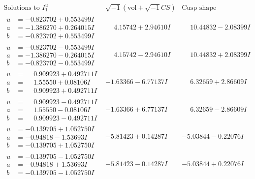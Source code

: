 \documentclass[1p]{elsarticle_modified}
\theoremstyle{definition}
\newcommand{\I}{\sqrt{-1}}
\begin{document}
$$\begin{array}{c|c|c}  
\text{Solutions to }I^u_{1}& \I (\text{vol} + \sqrt{-1}CS) & \text{Cusp shape}\\
 \hline 
\begin{aligned}
u &= -0.823702 + 0.553499 I \\
a &= -1.386270 + 0.264015 I \\
b &= -0.823702 + 0.553499 I\end{aligned}
 & \phantom{-}4.15742 + 2.94610 I & \phantom{-}10.44832 - 2.08399 I \\ \hline\begin{aligned}
u &= -0.823702 - 0.553499 I \\
a &= -1.386270 - 0.264015 I \\
b &= -0.823702 - 0.553499 I\end{aligned}
 & \phantom{-}4.15742 - 2.94610 I & \phantom{-}10.44832 + 2.08399 I \\ \hline\begin{aligned}
u &= \phantom{-}0.909923 + 0.492711 I \\
a &= \phantom{-}1.55550 + 0.08106 I \\
b &= \phantom{-}0.909923 + 0.492711 I\end{aligned}
 & -1.63366 - 6.77137 I & \phantom{-}6.32659 + 2.86609 I \\ \hline\begin{aligned}
u &= \phantom{-}0.909923 - 0.492711 I \\
a &= \phantom{-}1.55550 - 0.08106 I \\
b &= \phantom{-}0.909923 - 0.492711 I\end{aligned}
 & -1.63366 + 6.77137 I & \phantom{-}6.32659 - 2.86609 I \\ \hline\begin{aligned}
u &= -0.139705 + 1.052750 I \\
a &= -0.94818 - 1.53693 I \\
b &= -0.139705 + 1.052750 I\end{aligned}
 & -5.81423 + 0.14287 I & -5.03844 - 0.22076 I \\ \hline\begin{aligned}
u &= -0.139705 - 1.052750 I \\
a &= -0.94818 + 1.53693 I \\
b &= -0.139705 - 1.052750 I\end{aligned}
 & -5.81423 - 0.14287 I & -5.03844 + 0.22076 I \\ \hline\begin{aligned}

\end{aligned}
\end{array}$$
\end{document}
